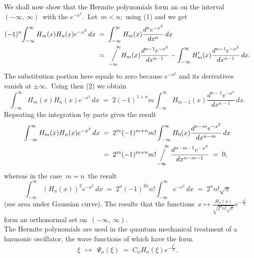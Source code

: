 \documentclass[12pt]{article}
\newcommand{\sijoitus}[2]%
{\operatornamewithlimits{\Big/}_{\!\!\!#1}^{\,#2}}
\theoremstyle{definition}
\begin{document}
We shall now show that the Hermite polynomials form an  on the interval \,$(-\infty,\,\infty)$\, with the  $e^{-x^2}$.\, Let\, 
$m < n$;\, using (1) and  we get
\begin{align*}   
(-1)^n\!\int_{-\infty}^\infty H_m(x)H_n(x)e^{-x^2}\,dx &\;=\; 
\int_{-\infty}^\infty H_m(x)\frac{d^ne^{-x^2}}{dx^n}\,dx\\ &\;=\;
 \sijoitus{-\infty}{\quad\infty}\!H_m(x)\frac{d^{n-1}e^{-x^2}}{dx^{n-1}}
-\int_{-\infty}^\infty H'_m(x)\frac{d^{n-1}e^{-x^2}}{dx^{n-1}}\,
dx.
\end{align*}
The substitution portion here equals to zero because $e^{-x^2}$ and its derivatives vanish at $\pm\infty$.\, Using then (2) we obtain
  $$\int_{-\infty}^\infty H_m(x)H_n(x)e^{-x^2}\,dx \;=\; 
2(-1)^{1+n}m\int_{-\infty}^\infty H_{m-1}(x)\frac{d^{n-1}e^{-x^2}}{dx^{n-1}}\,dx.$$
Repeating the integration by parts gives the result
\begin{align*}
\int_{-\infty}^\infty H_m(x)H_n(x)e^{-x^2}\,dx &\;=\; 
2^m(-1)^{m+n}m!\int_{-\infty}^\infty H_0(x)\frac{d^{n-m}e^{-x^2}}{dx^{n-m}}\,dx\\ &\;=\;
 2^m(-1)^{m+n}m!\!\sijoitus{-\infty}{\quad\infty}\frac{d^{n-m-1}e^{-x^2}}{dx^{n-m-1}} \;=\; 0,
\end{align*}
whereas in the case\, $m = n$\, the result
$$\int_{-\infty}^\infty (H_n(x))^2e^{-x^2}\,dx \;=\;
 2^n(-1)^{2n}n!\int_{-\infty}^\infty e^{-x^2}\,dx \;=\; 2^nn!\sqrt{\pi}$$
(see area under Gaussian curve).
The results  that the functions \,$x \mapsto\frac{H_n(x)}{\sqrt{2^nn!\sqrt{\pi}}}e^{-\frac{x^2}{2}}$\, form an orthonormal set on\, $(-\infty,\,\infty)$.\\

The Hermite polynomials are used in the quantum mechanical treatment of a harmonic oscillator, the wave functions of which have the form
    $$\xi \;\,\mapsto\,\; \Psi_n(\xi) \;=\; C_nH_n(\xi)e^{-\frac{\xi^2}{2}}.$$
\end{document}
